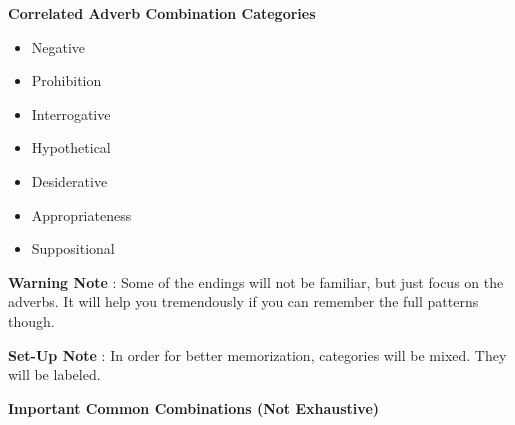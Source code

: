 \par{\textbf{Correlated Adverb Combination Categories }}

\begin{itemize}

\item Negative 
\item Prohibition 
\item Interrogative 
\item Hypothetical 
\item Desiderative 
\item Appropriateness 
\item Suppositional 
\end{itemize}

\par{\textbf{Warning Note }: Some of the endings will not be familiar, but just focus on the adverbs. It will help you tremendously if you can remember the full patterns though. }

\par{\textbf{Set-Up Note }: In order for better memorization, categories will be mixed. They will be labeled. }

\par{ \textbf{Important Common Combinations (Not Exhaustive) }}

